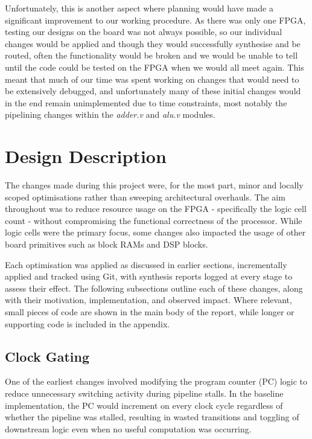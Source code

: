 \documentclass[a4paper,10pt]{article}
\begin{document}
Unfortunately, this is another aspect where planning would have made a significant
improvement to our working procedure. 
As there was only one FPGA, testing our designs on the board was not always possible,
so our individual changes would be applied and
though they would successfully synthesise and be routed,
often the functionality would be broken and we would be unable to tell until 
the code could be tested on the FPGA when we would all meet again.
This meant that much of our time was spent working on changes that would 
need to be extensively debugged, and unfortunately many of these initial changes
would in the end remain unimplemented due to time constraints,
most notably the pipelining changes within the 
\textit{adder.v} and \textit{alu.v} modules.

\section{Design Description}
\label{sec:Design_Description}

The changes made during this project were, for the most part, 
minor and locally scoped optimisations rather than sweeping architectural overhauls. 
The aim throughout was to reduce resource usage on the FPGA - 
specifically the logic cell count  - 
without compromising the functional correctness of the processor. 
While logic cells were the primary focus, 
some changes also impacted the usage of other board primitives 
such as block RAMs and DSP blocks. 

Each optimisation was applied as discussed in earlier sections,
incrementally applied and tracked using Git, 
with synthesis reports logged at every stage to assess their effect. 
The following subsections outline each of these changes, 
along with their motivation, implementation, and observed impact. 
Where relevant, small pieces of code are shown in the main body of the report, 
while longer or supporting code is included in the appendix.

\subsection{Clock Gating}
\label{sec:Gating}

One of the earliest changes involved modifying the program counter (PC) logic 
to reduce unnecessary switching activity during pipeline stalls. 
In the baseline implementation, the PC would increment 
on every clock cycle regardless of whether the pipeline was stalled, 
resulting in wasted transitions and toggling of downstream logic even 
when no useful computation was occurring.
\end{document}
